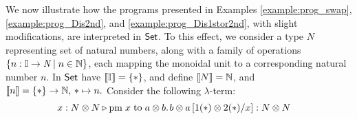 \begin{example}
  We now illustrate how the programs presented in Examples \ref{example:prog_swap}, \ref{example:prog_Dis2nd}, and \ref{example:prog_Dis1stor2nd}, with slight modifications, are interpreted in $\mathsf{Set}$.
   To this effect, we consider a type $N$ representing set of natural numbers, along with a family of operations $\{n : \mathbb{I} \to \emph{N} \mid n \in \mathbb{N}\}$, each mapping the monoidal unit to a corresponding natural number $n$. In $\mathsf{Set}$ have $\left \llbracket \mathbb{I} \right \rrbracket= \{*\}$, and define $\left \llbracket N \right \rrbracket = \mathbb{N}$, and  $\left \llbracket n \right \rrbracket = \{*\} \to \mathbb{N}, \, * \mapsto n.$ 
   Consider the following $\lambda$-term:
   \begin{equation*}
   \begin{split}
    &   x : N \otimes N \triangleright \text{pm} \hspace{3 pt} x \hspace{3 pt} \text{to} \hspace{3 pt} a \otimes b. \hspace{1pt} b \otimes a \, [1(*)\otimes 2 (*)/x]: N \otimes N 
  \end{split}
  \end{equation*}


\end{example}
